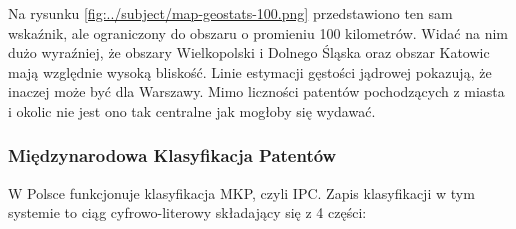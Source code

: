 
Na rysunku \ref{fig:../subject/map-geostats-100.png} przedstawiono ten sam
wskaźnik, ale ograniczony do obszaru o promieniu 100 kilometrów.
Widać na nim dużo wyraźniej, że obszary Wielkopolski i Dolnego Śląska
oraz obszar Katowic mają względnie wysoką bliskość. Linie estymacji gęstości
jądrowej pokazują, że inaczej może być dla Warszawy. Mimo liczności patentów
pochodzących z miasta i okolic nie jest ono tak centralne jak mogłoby się
wydawać. 





\subsubsection{Międzynarodowa Klasyfikacja Patentów}

W Polsce funkcjonuje klasyfikacja
\ac{MKP}, czyli \ac{IPC}. Zapis klasyfikacji w tym systemie to ciąg
cyfrowo-literowy składający się z 4 części:


